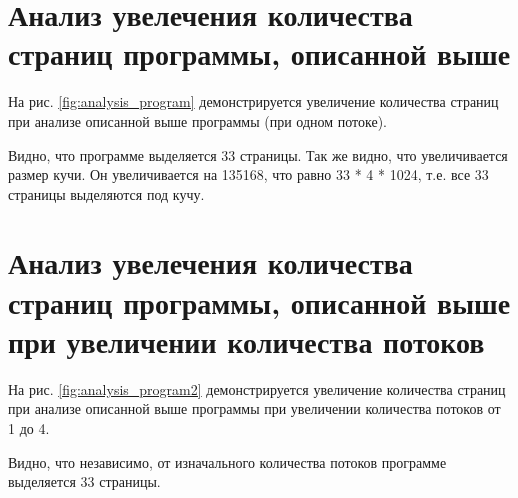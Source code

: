 \newpage


\section{Анализ увелечения количества страниц программы, описанной выше}

На рис. \ref{fig:analysis_program} демонстрируется увеличение количества страниц 
при анализе описанной выше программы (при одном потоке).

Видно, что программе выделяется 33 страницы. 
Так же видно, что увеличивается размер кучи. 
Он увеличивается на 135168, что равно 33 * 4 * 1024, т.е. все 33 страницы выделяются под кучу.

\begin{figure}[ht!]
\end{figure}

\newpage

\section{Анализ увелечения количества страниц программы, описанной выше при увеличении количества потоков}

На рис. \ref{fig:analysis_program2} демонстрируется увеличение количества страниц 
при анализе описанной выше программы при увеличении количества потоков от 1 до 4.

Видно, что независимо, от изначального количества потоков программе выделяется 33 страницы. 

